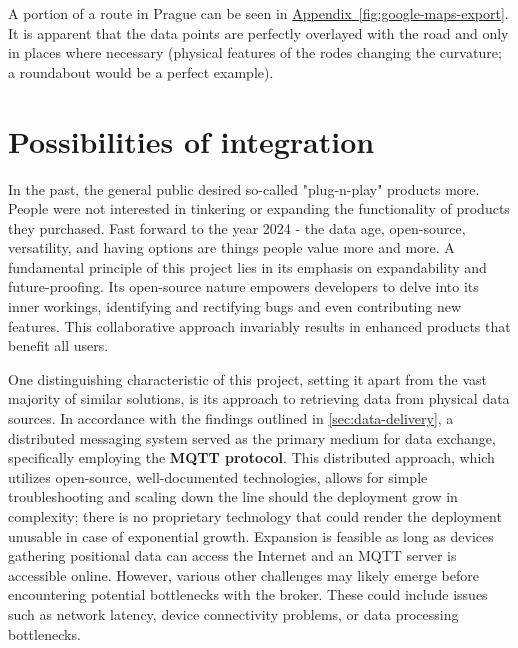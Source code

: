\documentclass[FM,BP,EN,fonts]{tulthesis}
\newcommand{\aref}[1]{\hyperref[#1]{Appendix~\ref*{#1}}}
\begin{document}
A portion of a route in Prague can be seen in \aref{fig:google-maps-export}. It is apparent that the data points are perfectly overlayed with the road and only in places where necessary (physical features of the rodes changing the curvature; a roundabout would be a perfect example).


\chapter{Possibilities of integration}
\label{chap:integration}
In the past, the general public desired so-called "plug-n-play" products more. People were not interested in tinkering or expanding the functionality of products they purchased. Fast forward to the year 2024 - the data age, open-source, versatility, and having options are things people value more and more. A fundamental principle of this project lies in its emphasis on expandability and future-proofing. Its open-source nature empowers developers to delve into its inner workings, identifying and rectifying bugs and even contributing new features. This collaborative approach invariably results in enhanced products that benefit all users.

One distinguishing characteristic of this project, setting it apart from the vast majority of similar solutions, is its approach to retrieving data from physical data sources. In accordance with the findings outlined in \autoref{sec:data-delivery}, a distributed messaging system served as the primary medium for data exchange, specifically employing the \textbf{MQTT protocol}. This distributed approach, which utilizes open-source, well-documented technologies, allows for simple troubleshooting and scaling down the line should the deployment grow in complexity; there is no proprietary technology that could render the deployment unusable in case of exponential growth. Expansion is feasible as long as devices gathering positional data can access the Internet and an MQTT server is accessible online. However, various other challenges may likely emerge before encountering potential bottlenecks with the broker. These could include issues such as network latency, device connectivity problems, or data processing bottlenecks.
\end{document}
